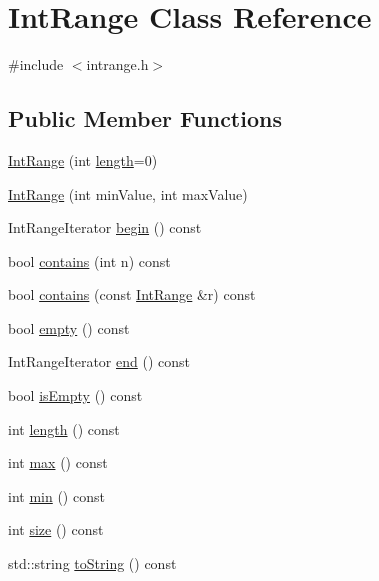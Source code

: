 \hypertarget{classIntRange}{}\section{Int\+Range Class Reference}
\label{classIntRange}


{\ttfamily \#include $<$intrange.\+h$>$}

\subsection*{Public Member Functions}
\begin{DoxyCompactItemize}
\item 
\mbox{\hyperlink{classIntRange_a1371e812388f10db89e8cea0edeec000}{Int\+Range}} (int \mbox{\hyperlink{classIntRange_a91213974fa3ac3959b1c355a9e588f8d}{length}}=0)
\item 
\mbox{\hyperlink{classIntRange_a9e8543f0451b16061adafee2d9ad0f84}{Int\+Range}} (int min\+Value, int max\+Value)
\item 
Int\+Range\+Iterator \mbox{\hyperlink{classIntRange_a71b24b84d58ec13662a463eddc2e085c}{begin}} () const
\item 
bool \mbox{\hyperlink{classIntRange_ab0197de90231da6a241cf66cd6b16edc}{contains}} (int n) const
\item 
bool \mbox{\hyperlink{classIntRange_a71626971ecae788078a3ba3e7ffc7201}{contains}} (const \mbox{\hyperlink{classIntRange}{Int\+Range}} \&r) const
\item 
bool \mbox{\hyperlink{classIntRange_a644718bb2fb240de962dc3c9a1fdf0dc}{empty}} () const
\item 
Int\+Range\+Iterator \mbox{\hyperlink{classIntRange_ad919bd40bd4298cafd0955b8031f4bef}{end}} () const
\item 
bool \mbox{\hyperlink{classIntRange_acf82f9b2937375c7b1cf3dccb3df3312}{is\+Empty}} () const
\item 
int \mbox{\hyperlink{classIntRange_a91213974fa3ac3959b1c355a9e588f8d}{length}} () const
\item 
int \mbox{\hyperlink{classIntRange_a86ad4228f3fccc681e8716ac9c68ab4d}{max}} () const
\item 
int \mbox{\hyperlink{classIntRange_a4ec1ccea7eddbc7355ba5d00afcaec2d}{min}} () const
\item 
int \mbox{\hyperlink{classIntRange_af9593d4a5ff4274efaf429cb4f9e57cc}{size}} () const
\item 
std\+::string \mbox{\hyperlink{classIntRange_a1fe5121d6528fdea3f243321b3fa3a49}{to\+String}} () const
\end{DoxyCompactItemize}
